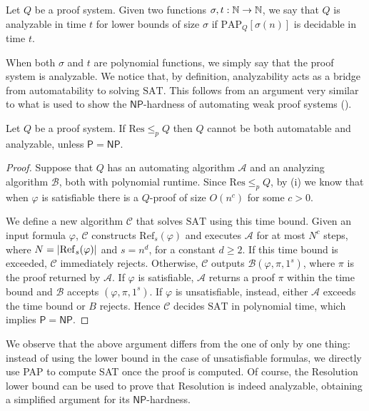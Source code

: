 \begin{definition}[Analyzability]
    Let $Q$ be a proof system. Given two functions $\sigma,t : \mathbb{N} \to \mathbb{N}$, we say that $Q$ is analyzable in time $t$ for lower bounds of size $\sigma$ if $\mathrm{PAP}_Q[\sigma(n)]$ is decidable in time $t$.
\end{definition}

When both $\sigma$ and $t$ are polynomial functions, we simply say that the proof system is analyzable. We notice that, by definition, analyzability acts as a bridge from automatability to solving $\mathrm{SAT}$. This follows from an argument very similar to what is used to show the  $\mathsf{NP}$-hardness of automating weak proof systems ().

\begin{proposition}
    \label{prop:aut_an}
    Let $Q$ be a proof system. If $\mathrm{Res} \leq_p Q$ then $Q$ cannot be both automatable and analyzable, unless $\mathsf{P} = \mathsf{NP}$.
\end{proposition}

\begin{proof}
    Suppose that $Q$ has an automating algorithm $\mathcal{A}$ and an analyzing algorithm $\mathcal{B}$, both with polynomial runtime. Since $\mathrm{Res} \leq_p Q$, by (i) we know that when $\varphi$ is satisfiable there is a $Q$-proof of size $O(n^c)$ for some $c > 0$.
    
    We define a new algorithm $\mathcal{C}$ that solves $\mathrm{SAT}$ using this time bound. Given an input formula $\varphi$, $\mathcal{C}$ constructs $\mathrm{Ref}_s(\varphi)$ and executes $\mathcal{A}$ for at most $N^c$ steps, where $N = \left|\mathrm{Ref}_s(\varphi)\right|$ and $s = n^d$, for a constant $d\geq 2$. If this time bound is exceeded, $\mathcal{C}$ immediately rejects. Otherwise, $\mathcal{C}$ outputs $\mathcal{B}(\varphi, \pi, 1^s)$, where $\pi$ is the proof returned by $\mathcal{A}$. If $\varphi$ is satisfiable, $\mathcal{A}$ returns a proof $\pi$ within the time bound and $\mathcal{B}$ accepts $(\varphi, \pi, 1^s)$. If $\varphi$ is unsatisfiable, instead, either $\mathcal{A}$ exceeds the time bound or $B$ rejects. Hence $\mathcal{C}$ decides $\mathrm{SAT}$ in polynomial time, which implies $\mathsf{P} = \mathsf{NP}$.
\end{proof}

We observe that the above argument differs from the one of  only by one thing: instead of using the lower bound in the case of unsatisfiable formulas, we directly use PAP to compute SAT once the proof is computed. Of course, the Resolution lower bound can be used to prove that Resolution is indeed analyzable, obtaining a simplified argument for its $\mathsf{NP}$-hardness. 

